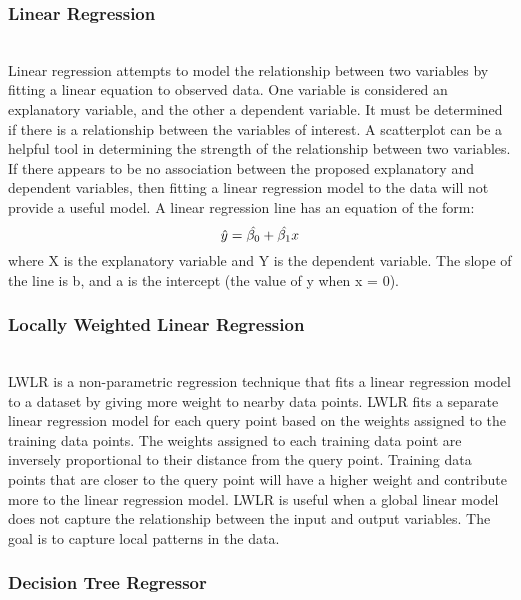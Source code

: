 \documentclass[conference]{IEEEtran}
\begin{document}
\subsubsection{Linear Regression}\\

Linear regression attempts to model the relationship between two variables by fitting a linear equation to observed data.
One variable is considered an explanatory variable, and the other a dependent variable.
It must be determined if there is a relationship between the variables of interest.
A scatterplot can be a helpful tool in determining the strength of the relationship between two variables.
If there appears to be no association between the proposed explanatory and dependent variables, then fitting a linear regression model to the data will not provide a useful model.
A linear regression line has an equation of the form:
\begin{equation}
\hat{y} = \hat{\beta_{0}} + \hat{\beta_{1}}x  \\ \label{eq:1}
\end{equation}
where X is the explanatory variable and Y is the dependent variable.
The slope of the line is b, and a is the intercept (the value of y when x = 0).

\subsubsection{Locally Weighted Linear Regression}\\

LWLR is a non-parametric regression technique that fits a linear regression model to a dataset by giving more weight to nearby data points.
LWLR fits a separate linear regression model for each query point based on the weights assigned to the training data points.
The weights assigned to each training data point are inversely proportional to their distance from the query point.
Training data points that are closer to the query point will have a higher weight and contribute more to the linear regression model.
LWLR is useful when a global linear model does not capture the relationship between the input and output variables.
The goal is to capture local patterns in the data.

\subsubsection{Decision Tree Regressor}\\
\end{document}

